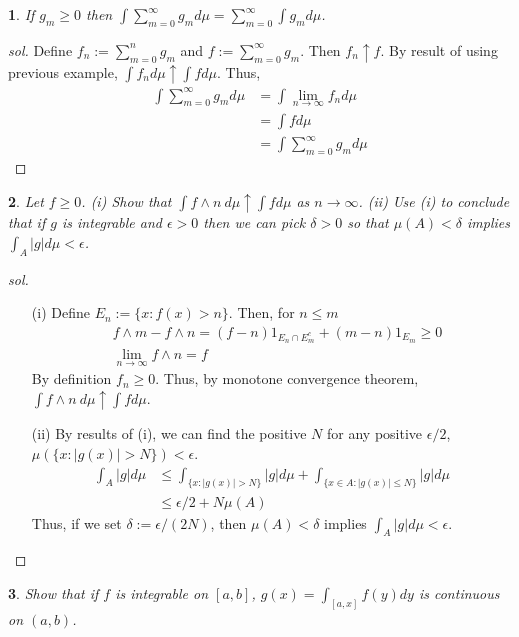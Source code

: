 \documentclass{report}
\newtheorem{ex}{}[section]
\begin{document}
\begin{ex}
If $g_m \ge 0$ then $\int \sum_{m=0}^\infty g_m d\mu = \sum_{m=0}^\infty \int g_m d\mu$.
\end{ex}
\begin{proof}[sol]
Define $f_n := \sum_{m=0}^n g_m$ and $f := \sum_{m=0}^\infty g_m$. Then $f_n \uparrow f$. By result of using previous example, $\int f_nd\mu \uparrow \int fd\mu$. Thus,
\begin{align*}
    \int \sum_{m=0}^\infty g_m d\mu &=\int \lim_{n\to\infty}f_nd\mu\\
    &= \int fd\mu\\
    &= \int \sum_{m=0}^\infty g_md\mu
\end{align*}
\end{proof}
\begin{ex}
Let $f \ge 0$. (i) Show that $\int f \land n \ d\mu \uparrow \int fd\mu$ as $n\to\infty$. (ii) Use (i) to conclude that if $g$ is integrable and $\epsilon > 0$ then we can pick $\delta > 0$ so that $\mu(A) < \delta$ implies $\int_A |g|d\mu < \epsilon$.
\end{ex}
\begin{proof}[sol]~
\begin{enumerate}
    \item[(i)] 
Define $E_n := \{x : f(x) > n\}$. Then, for $n \le m$
\begin{align*}
   &f \land m -  f \land n = (f-n) 1_{E_n \cap E_m^c} + (m-n)1_{E_m} \ge 0\\
   &\lim_{n\to\infty} f \land n = f
\end{align*}
By definition $f_n \ge 0$. Thus, by monotone convergence theorem, $\int f \land n \ d\mu \uparrow \int fd\mu$.
\item[(ii)] By results of (i), we can find the positive $N$ for any positive $\epsilon/ 2$, $\mu(\{x : |g(x)| > N\}) < \epsilon$. 
\begin{align*}
    \int_A |g|d\mu &\le \int_{\{x : |g(x)| > N\}} |g|d\mu +  \int_{\{x \in A : |g(x)| \le N\}} |g|d\mu\\
    &\le \epsilon /2 + N \mu(A)
\end{align*}
Thus, if we set $\delta := \epsilon /(2N)$, then $\mu(A) < \delta$ implies $\int_A |g|d\mu < \epsilon$.
\end{enumerate}
\end{proof}
\begin{ex}
Show that if $f$ is integrable on $[a,b]$, $g(x) = \int_{[a,x]}f(y)dy$ is continuous on $(a,b)$.
\end{ex}
\end{document}
